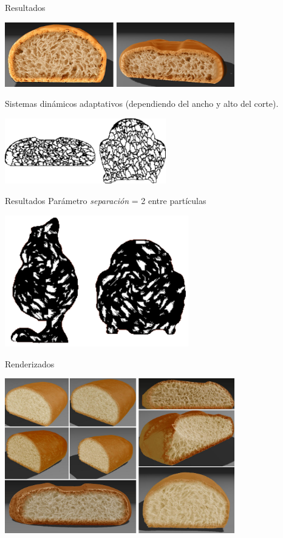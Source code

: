 \documentclass[spanish]{beamer}
\begin{document}
\begin{frame}{Resultados}
\centerline{\includegraphics[width=10cm]{../figures/Fig11CAVW}}


Sistemas dinámicos adaptativos (dependiendo del ancho y alto del corte).

\centerline{\includegraphics[width=7cm]{../figures/Fig6}}

\end{frame}

\begin{frame}{Resultados}
Parámetro {\em separación} = 2 entre partículas

\centerline{\includegraphics[width=8cm]{../figures/Fig7}}
\end{frame}

\begin{frame}{Renderizados}

\centerline{\includegraphics[width=10cm]{../figures/Fig12CAVW}}
\end{frame}
\end{document}
